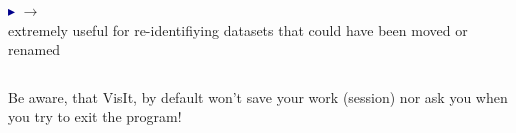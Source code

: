 \begin{frame}
\begin{columns}
\begin{column}{5.5cm}
        \vspace{3.5mm}
        \textcolor{DarkBlue}{$\blacktriangleright$}
         $\rightarrow$ 
        \\
        extremely useful for re-identifiying datasets that could have been moved or renamed
\end{column}
\end{columns}
\pause
\vspace{2mm}
\begin{beamerboxesrounded}[upper=block head,lower=block body,shadow=true]{}
Be aware, that VisIt, by default won't save your work (session) nor ask you when you try to exit the program!
\end{beamerboxesrounded}
\end{frame}




